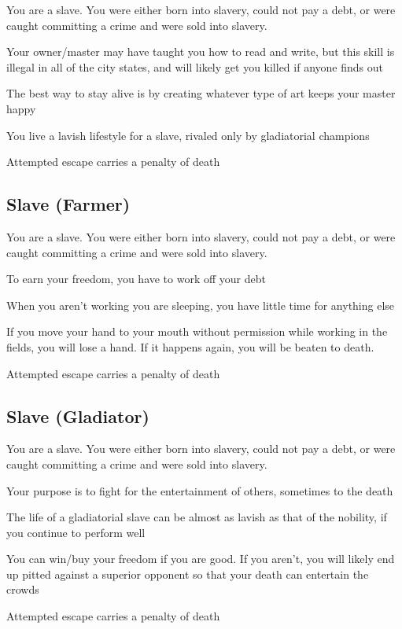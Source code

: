 \begin{multicols}{2}
\begin{description}
    \item You are a slave. You were either born into slavery, could not pay a debt, or were caught committing a crime and were sold into slavery.
    \item Your owner/master may have taught you how to read and write, but this skill is illegal in all of the city states, and will likely get you killed if anyone finds out
    \item The best way to stay alive is by creating whatever type of art keeps your master happy
    \item You live a lavish lifestyle for a slave, rivaled only by gladiatorial champions
    \item Attempted escape carries a penalty of death
\end{description}

\subsection{Slave (Farmer)}

\begin{description}
    \item You are a slave. You were either born into slavery, could not pay a debt, or were caught committing a crime and were sold into slavery.
    \item To earn your freedom, you have to work off your debt
    \item When you aren’t working you are sleeping, you have little time for anything else
    \item If you move your hand to your mouth without permission while working in the fields, you will lose a hand. If it happens again, you will be beaten to death.
    \item Attempted escape carries a penalty of death
\end{description}

\subsection{Slave (Gladiator)}

\begin{description}
    \item You are a slave. You were either born into slavery, could not pay a debt, or were caught committing a crime and were sold into slavery.
    \item Your purpose is to fight for the entertainment of others, sometimes to the death
    \item The life of a gladiatorial slave can be almost as lavish as that of the nobility, if you continue to perform well
    \item You can win/buy your freedom if you are good. If you aren’t, you will likely end up pitted against a superior opponent so that your death can entertain the crowds
    \item Attempted escape carries a penalty of death
\end{description}


\end{multicols}
